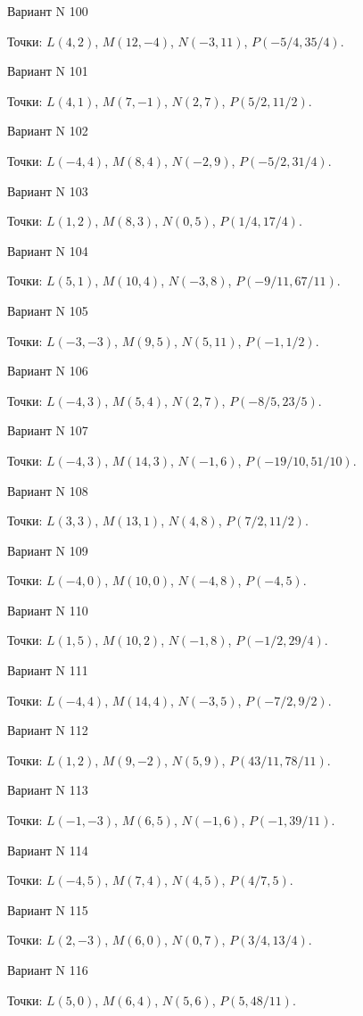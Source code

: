 \documentclass[11pt]{report}
\begin{document}
Вариант N 100

Точки: $L(4, 2)$, $M(12, -4)$, $N(-3, 11)$, $P(-5/4, 35/4)$.

Вариант N 101

Точки: $L(4, 1)$, $M(7, -1)$, $N(2, 7)$, $P(5/2, 11/2)$.

Вариант N 102

Точки: $L(-4, 4)$, $M(8, 4)$, $N(-2, 9)$, $P(-5/2, 31/4)$.

Вариант N 103

Точки: $L(1, 2)$, $M(8, 3)$, $N(0, 5)$, $P(1/4, 17/4)$.

Вариант N 104

Точки: $L(5, 1)$, $M(10, 4)$, $N(-3, 8)$, $P(-9/11, 67/11)$.

Вариант N 105

Точки: $L(-3, -3)$, $M(9, 5)$, $N(5, 11)$, $P(-1, 1/2)$.

Вариант N 106

Точки: $L(-4, 3)$, $M(5, 4)$, $N(2, 7)$, $P(-8/5, 23/5)$.

Вариант N 107

Точки: $L(-4, 3)$, $M(14, 3)$, $N(-1, 6)$, $P(-19/10, 51/10)$.

Вариант N 108

Точки: $L(3, 3)$, $M(13, 1)$, $N(4, 8)$, $P(7/2, 11/2)$.

Вариант N 109

Точки: $L(-4, 0)$, $M(10, 0)$, $N(-4, 8)$, $P(-4, 5)$.

Вариант N 110

Точки: $L(1, 5)$, $M(10, 2)$, $N(-1, 8)$, $P(-1/2, 29/4)$.

Вариант N 111

Точки: $L(-4, 4)$, $M(14, 4)$, $N(-3, 5)$, $P(-7/2, 9/2)$.

Вариант N 112

Точки: $L(1, 2)$, $M(9, -2)$, $N(5, 9)$, $P(43/11, 78/11)$.

Вариант N 113

Точки: $L(-1, -3)$, $M(6, 5)$, $N(-1, 6)$, $P(-1, 39/11)$.

Вариант N 114

Точки: $L(-4, 5)$, $M(7, 4)$, $N(4, 5)$, $P(4/7, 5)$.

Вариант N 115

Точки: $L(2, -3)$, $M(6, 0)$, $N(0, 7)$, $P(3/4, 13/4)$.

Вариант N 116

Точки: $L(5, 0)$, $M(6, 4)$, $N(5, 6)$, $P(5, 48/11)$.
\end{document}
